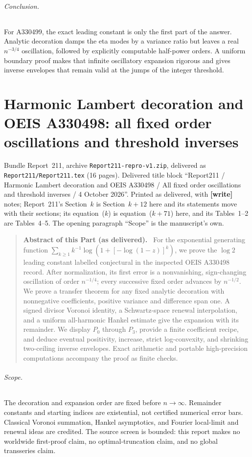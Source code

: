 \documentclass[11pt]{article}
\theoremstyle{definition}\newtheorem{definition}[theorem]{Definition}
\theoremstyle{remark}\newtheorem{remark}[theorem]{Remark}
\newcommand{\file}[1]{\nolinkurl{#1}}
\newenvironment{partabstract}{\begin{quote}\small\noindent\textbf{Abstract of this Part (as delivered).}\ }{\end{quote}}
\newcommand{\partsource}[1]{\par\noindent\begin{minipage}{\textwidth}\small #1\end{minipage}\par\medskip}
\begin{document}
\paragraph{Conclusion.}
For A330499, the exact leading constant is only the first part of the
answer. Analytic decoration damps the eta modes by a variance ratio
but leaves a real $n^{-3/4}$ oscillation, followed by explicitly
computable half-power orders. A uniform boundary proof makes that
infinite oscillatory expansion rigorous and gives inverse envelopes
that remain valid at the jumps of the integer threshold.

\part{Harmonic Lambert decoration and OEIS A330498: all fixed order oscillations and threshold inverses}\label{dep:hl:part}
\partsource{Bundle Report~211, archive \file{Report211-repro-v1.zip}, delivered as \file{Report211/Report211.tex} (16 pages). Delivered title block ``Report211 / Harmonic Lambert decoration and OEIS A330498 / All fixed order oscillations and threshold inverses / 4 October 2026''. Printed as delivered, with \textbf{[write]} notes; Report~211's Section~$k$ is Section~$k+12$ here and its statements move with their sections; its equation~($k$) is equation~($k+71$) here, and its Tables~1--2 are Tables~4--5. The opening paragraph ``Scope'' is the manuscript's own.}
\begin{partabstract}
For the exponential generating function
$\sum_{k\ge1}k^{-1}\log(1+[-\log(1-z)]^k)$, we prove the
$\log 2$ leading constant labelled conjectural in the inspected OEIS
A330498 record. After normalization, its first error is a nonvanishing,
sign-changing oscillation of order $n^{-1/4}$; every successive fixed
order advances by $n^{-1/2}$. We prove a transfer theorem for any fixed
analytic decoration with nonnegative coefficients, positive variance
and difference span one. A signed divisor Voronoi identity, a
Schwartz-space renewal interpolation, and a uniform all-harmonic
Hankel estimate give the expansion with its remainder. We display
$P_0$ through $P_3$, provide a finite coefficient recipe, and deduce
eventual positivity, increase, strict log-convexity, and shrinking
two-ceiling inverse envelopes. Exact arithmetic and portable
high-precision computations accompany the proof as finite checks.
\end{partabstract}

\paragraph{Scope.}
The decoration and expansion order are fixed before $n\to\infty$.
Remainder constants and starting indices are existential, not certified
numerical error bars. Classical Voronoi summation, Hankel asymptotics,
and Fourier local-limit and renewal ideas are credited. The source
screen is bounded: this report makes no worldwide first-proof claim,
no optimal-truncation claim, and no global transseries claim.
\end{document}
